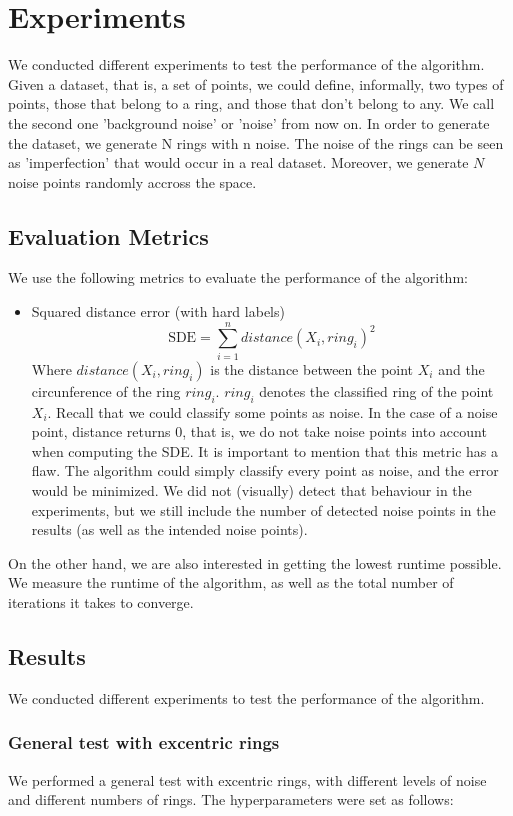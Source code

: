 \documentclass[conference]{IEEEtran}
\begin{document}
\section{Experiments}
We conducted different experiments to test the performance of the algorithm. Given a dataset, that is, a set of points, we could define, informally,
two types of points, those that belong to a ring, and those that don't belong to any. We call the second one 'background noise' or 'noise' from now on.
In order to generate the dataset, we generate N rings with n noise. The noise of the rings can be seen as 'imperfection' that would occur in a real dataset.
Moreover, we generate $N$ noise points randomly accross the space.
\subsection{Evaluation Metrics}
We use the following metrics to evaluate the performance of the algorithm:
\begin{itemize}
    \item Squared distance error (with hard labels)
    \begin{equation}
        \text{SDE} = \sum_{i=1}^{n} distance(X_i, ring_i)^2
    \end{equation}
    Where $distance(X_i, ring_i)$ is the distance between the point $X_i$ and the circunference of the ring $ring_i$.
    $ring_i$ denotes the classified ring of the point $X_i$.
    Recall that we could classify some points as noise. In the case of a noise point, distance returns 0, that is,
    we do not take noise points into account when computing the SDE.
    It is important to mention that this metric has a flaw. The algorithm could simply classify every point as noise, and the error would be minimized.
    We did not (visually) detect that behaviour in the experiments, but we still include the number of detected noise points in the results (as well as the intended noise points).
\end{itemize}
On the other hand, we are also interested in getting the lowest runtime possible. We measure the runtime of the algorithm, as well as the total number of iterations it takes to converge.

\subsection{Results}
We conducted different experiments to test the performance of the algorithm.
\subsubsection{General test with excentric rings}
We performed a general test with excentric rings, with different levels of noise and different numbers of rings.
The hyperparameters were set as follows:
\end{document}

